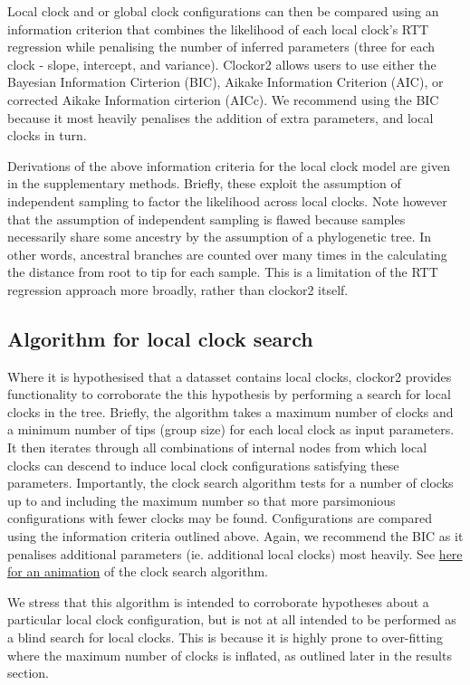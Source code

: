\documentclass{article}
\begin{document}
Local clock and or global clock configurations can then be compared using an information criterion that combines the likelihood of each local clock's RTT regression while penalising the number of inferred parameters (three for each clock - slope, intercept, and variance). Clockor2 allows users to use either the Bayesian Information Cirterion (BIC), Aikake Information Criterion (AIC), or corrected Aikake Information cirterion (AICc). We recommend using the BIC because it most heavily penalises the addition of extra parameters, and local clocks in turn.

Derivations of the above information criteria for the local clock model are given in the supplementary methods. Briefly, these exploit the assumption of independent sampling to factor the likelihood across local clocks. Note however that the assumption of independent sampling is flawed because samples necessarily share some ancestry by the assumption of a phylogenetic tree. In other words, ancestral branches are counted over many times in the calculating the distance from root to tip for each sample. This is a limitation of the RTT regression approach more broadly, rather than clockor2 itself.


\subsection*{Algorithm for local clock search}
Where it is hypothesised that a datasset contains local clocks, clockor2 provides functionality to corroborate the this hypothesis by performing a search for local clocks in the tree. Briefly, the algorithm takes a maximum number of clocks and a minimum number of tips (group size) for each local clock as input parameters. It then iterates through all combinations of internal nodes from which local clocks can descend to induce local clock configurations satisfying these parameters. Importantly, the clock search algorithm tests for a number of clocks up to and including the maximum number so that more parsimonious configurations with fewer clocks may be found. Configurations are compared using the information criteria outlined above. Again, we recommend the BIC as it penalises additional parameters (ie. additional local clocks) most heavily. See \href{https://github.com/LeoFeatherstone/clockor2Paper/blob/main/figures/clockSearchEg2Clocks.gif}{here for an animation} of the clock search algorithm. 

We stress that this algorithm is intended to corroborate hypotheses about a particular local clock configuration, but is not at all intended to be performed as a blind search for local clocks. This is because it is highly prone to over-fitting where the maximum number of clocks is inflated, as outlined later in the results section.
\end{document}
